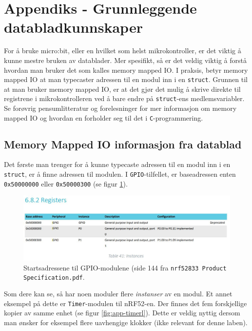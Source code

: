 \appendix


\section{Appendiks - Grunnleggende databladkunnskaper}\label{app:datablad}

For å bruke micro:bit, eller en hvilket som helst mikrokontroller, er det viktig å kunne mestre bruken av datablader. Mer spesifikt, så er det veldig viktig å forstå hvordan man bruker det som kalles memory mapped IO. I praksis, betyr memory mapped IO at man typecaster adressen til en modul inn i en \verb|struct|. Grunnen til at man bruker memory mapped IO, er at det gjør det mulig å skrive direkte til registrene i mikrokontrolleren ved å bare endre på \verb|struct|-ens medlemsvariabler. Se forøvrig pensumlitteratur og forelesninger for mer informasjon om memory mapped IO og hvordan en forholder seg til det i \verb|C|-programmering.

\subsection{Memory Mapped IO informasjon fra datablad}
Det første man trenger for å kunne typecaste adressen til en modul inn i en \verb|struct|, er å finne adressen til modulen. I \verb|GPIO|-tilfellet, er baseadressen enten \verb|0x50000000| eller \verb|0x50000300| (se figur \ref{fig:app-gpio-modul}).


\begin{figure}[ht]
    \centering
    \includegraphics[scale=0.615]{figures/gpio_addresse.JPG}
    \caption{Startsadressene til GPIO-modulene (side 144 fra \texttt{nrf52833 Product Specification.pdf}.}
    \label{fig:app-gpio-modul}
\end{figure}

Som dere kan se, så har noen moduler flere \textit{instanser} av en modul. Et annet eksempel på dette er \verb|Timer|-modulen til nRF52-en. Der finnes det fem forskjellige kopier av samme enhet (se figur \ref{fig:app-timerl}). Dette er veldig nyttig dersom man ønsker for eksempel flere uavhengige klokker (ikke relevant for denne laben).

